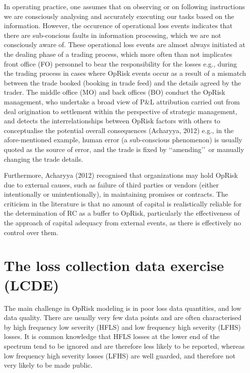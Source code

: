 \documentclass[]{DissertateUSU}
\begin{document}
In operating practice, one assumes that on observing or on following
instructions we are consciously analysing and accurately executing our
tasks based on the information. However, the occurence of operational
loss events indicates that there are sub-concious faults in information
processing, which we are not consciously aware of. These operational
loss events are almost always initiated at the dealing phase of a
trading process, which more often than not implicates front office (FO)
personnel to bear the responsibility for the losses e.g., during the
trading process in cases where OpRisk events occur as a result of a
mismatch between the trade booked (booking in trade feed) and the
details agreed by the trader. The middle office (MO) and back offices
(BO) conduct the OpRisk management, who undertake a broad view of P\&L
attribution carried out from deal origination to settlement within the
perspective of strategic management, and detects the interrelationships
between OpRisk factors with others to conceptualise the potential
overall consequences (Acharyya, 2012) e.g., in the afore-mentioned
example, human error (a sub-conscious phenomenon) is usually quoted as
the source of error, and the trade is fixed by \lq\lq amending\rq\rq~or
manually changing the trade details. \medskip

Furthermore, Acharyya (2012) recognised that organizations may hold
OpRisk due to external causes, such as failure of third parties or
vendors (either intentionally or unintentionally), in maintaining
promises or contracts. The criticism in the literature is that no amount
of capital is realistically reliable for the determination of RC as a
buffer to OpRisk, particularly the effectiveness of the approach of
capital adequacy from external events, as there is effectively no
control over them.\medskip

\section{The loss collection data exercise (LCDE)}
\label{sec:The loss collection data exercise (LCDE)}

The main challenge in OpRisk modeling is in poor loss data quantities,
and low data quality. There are usually very few data points and are
often characterised by high frequency low severity (HFLS) and low
frequency high severity (LFHS) losses. It is common knowledge that HFLS
losses at the lower end of the spectrum tend to be ignored and are
therefore less likely to be reported, whereas low frequency high
severity losses (LFHS) are well guarded, and therefore not very likely
to be made public.\medskip
\end{document}
